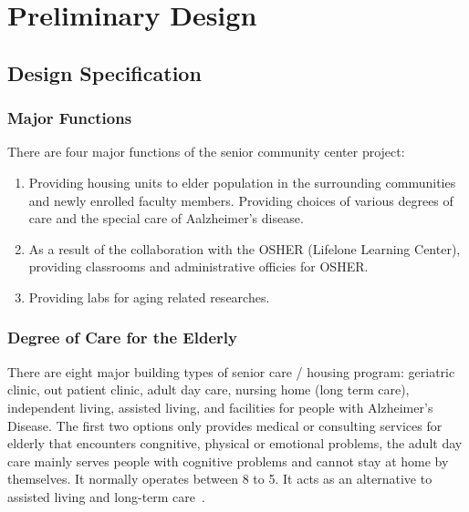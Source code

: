 
\chapter{Preliminary Design} %

\label{Chapter3} %


\section{Design Specification}
\subsection{Major Functions}
There are four major functions of the senior community center project:
\begin{enumerate}
\item Providing housing units to elder population in the surrounding
  communities and newly enrolled faculty members. Providing choices of 
  various degrees of care and the special care of Aalzheimer's
  disease. 
\item As a result of the collaboration with the OSHER (Lifelone
  Learning Center), providing classrooms and administrative officies
  for OSHER. 
\item Providing labs for aging related researches.
\end{enumerate}
\subsection{Degree of Care for the Elderly}
There are eight major building types of senior care / housing program:
geriatric clinic, out patient clinic, adult day care, nursing home
(long term care), independent living, assisted living, and facilities
for people with Alzheimer's Disease. The first two options only
provides medical or consulting services for elderly that encounters
congnitive, physical or emotional problems, the adult day care mainly
serves people with cognitive problems and cannot stay at home by
themselves. It normally operates between 8 to 5. It acts as an
alternative to assisted living and long-term care~\cite{seniorLiving}.

